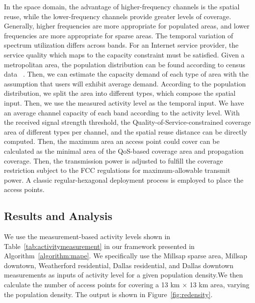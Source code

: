 In the space domain, the advantage of higher-frequency channels is the spatial reuse, while the lower-frequency 
channels provide greater levels of coverage. Generally, higher frequencies are more appropriate for populated 
areas, and lower frequencies are more appropriate for sparse areas. The temporal variation of spectrum utilization 
differs across bands. For an Internet service provider, the service quality which maps to the capacity constraint 
must be satisfied. Given a metropolitan area, the population distribution can be found according to census data
~\cite{uscensus}. Then, we can estimate the capacity demand of each type of area with the assumption that users 
will exhibit average demand. According to the population distribution, we split the area into different types,
which compose the spatial input. Then, we use the measured activity level as the temporal input. We have an average 
channel capacity of each band according to the activity level. With the received signal strength threshold, the 
Quality-of-Service-constrained coverage area of different types per channel, and the spatial reuse distance can be 
directly computed. Then, the maximum area an access point could cover can be calculated as the minimal area of the 
QoS-based coverage area and propagation coverage. Then, the transmission power is adjusted to fulfill the coverage 
restriction subject to the FCC regulations for maximum-allowable transmit power. A classic regular-hexagonal deployment 
process is employed to place the access points. 

\subsection{Results and Analysis}
\label{subsec:winmeeresult}

We use the measurement-based activity levels shown in Table~\ref{tab:activitymeasurement} in our framework presented
in Algorithm~\ref{algorithm:mape}. We specifically use the Millsap sparse area, Millsap downtown, Weatherford residential, 
Dallas residential, and Dallas downtown measurements as inputs of activity level for a given population density.We then 
calculate the number of access points for covering a 13 km $\times$ 13 km area, varying the population density. The 
output is shown in Figure~\ref{fig:redensity}. 

